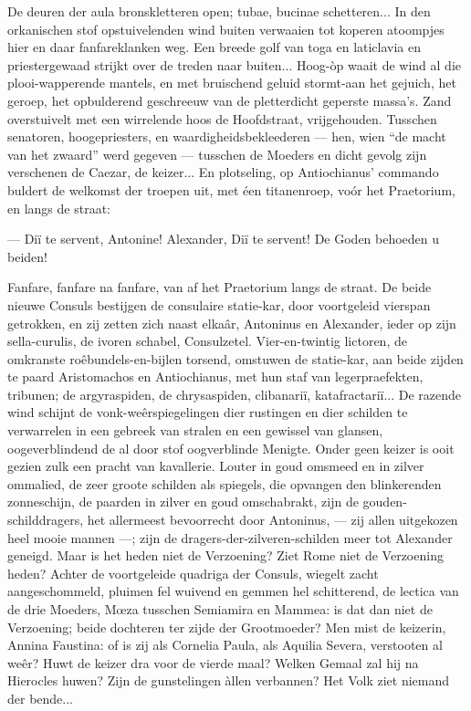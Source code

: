 \documentclass[a4paper, 12pt, oneside, dutch]{article}
\begin{document}
De deuren der aula bronskletteren open; tubae, bucinae schetteren... In den orkanischen stof opstuivelenden wind buiten verwaaien tot koperen atoompjes hier en daar fanfareklanken weg. Een breede golf van toga en laticlavia en priestergewaad strijkt over de treden naar buiten... Hoog-òp waait de wind al die plooi-wapperende mantels, en met bruischend geluid stormt-aan het gejuich, het geroep, het opbulderend geschreeuw van de pletterdicht geperste massa's. Zand overstuivelt met een wirrelende hoos de Hoofdstraat, vrijgehouden. Tusschen senatoren, hoogepriesters, en waardigheidsbekleederen --- hen, wien "`de macht van het zwaard"' werd gegeven --- tusschen de Moeders en dicht gevolg zijn verschenen de Caezar, de keizer... En plotseling, op Antiochianus' commando buldert de welkomst der troepen uit, met éen titanenroep, voór het Praetorium, en langs de straat:

--- Diï te servent, Antonine! Alexander, Diï te servent! De Goden behoeden u beiden!

Fanfare, fanfare na fanfare, van af het Praetorium langs de straat. De beide nieuwe Consuls bestijgen de consulaire statie-kar, door voortgeleid vierspan getrokken, en zij zetten zich naast elkaâr, Antoninus en Alexander, ieder op zijn sella-curulis, de ivoren schabel, Consulzetel. Vier-en-twintig lictoren, de omkranste roêbundels-en-bijlen torsend, omstuwen de statie-kar, aan beide zijden te paard Aristomachos en Antiochianus, met hun staf van legerpraefekten, tribunen; de argyraspiden, de chrysaspiden, clibanariï, katafractariï... De razende wind schijnt de vonk-weêrspiegelingen dier rustingen en dier schilden te verwarrelen in een gebreek van stralen en een gewissel van glansen, oogeverblindend de al door stof oogverblinde Menigte. Onder geen keizer is ooit gezien zulk een pracht van kavallerie. Louter in goud omsmeed en in zilver ommalied, de zeer groote schilden als spiegels, die opvangen den blinkerenden zonneschijn, de paarden in zilver en goud omschabrakt, zijn de gouden-schilddragers, het allermeest bevoorrecht door Antoninus, --- zij allen uitgekozen heel mooie mannen ---; zijn de dragers-der-zilveren-schilden meer tot Alexander geneigd. Maar is het heden niet de Verzoening? Ziet Rome niet de Verzoening heden? Achter de voortgeleide quadriga der Consuls, wiegelt zacht aangeschommeld, pluimen fel wuivend en gemmen hel schitterend, de lectica van de drie Moeders, Mœza tusschen Semiamira en Mammea: is dat dan niet de Verzoening; beide dochteren ter zijde der Grootmoeder? Men mist de keizerin, Annina Faustina: of is zij als Cornelia Paula, als Aquilia Severa, verstooten al weêr? Huwt de keizer dra voor de vierde maal? Welken Gemaal zal hij na Hierocles huwen? Zijn de gunstelingen àllen verbannen? Het Volk ziet niemand der bende...
\end{document}
